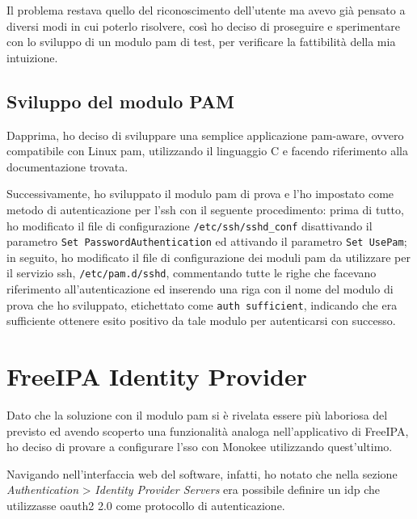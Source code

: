 Il problema restava quello del riconoscimento dell'utente ma avevo già pensato a diversi modi in cui poterlo risolvere, così ho deciso di proseguire e sperimentare con lo sviluppo di un modulo \acrshort{pam} di test, per verificare la fattibilità della mia intuizione.

\subsection{Sviluppo del modulo PAM}
Dapprima, ho deciso di sviluppare una semplice applicazione \acrshort{pam}-aware\cite{site:pam-app}, ovvero compatibile con Linux \acrshort{pam}, utilizzando il linguaggio C e facendo riferimento alla documentazione trovata\cite{site:writing-pam-application}\cite{site:understanding-pam}\cite{site:pam-configuration}\cite{site:linux-man-online}.  

Successivamente, ho sviluppato il modulo \acrshort{pam} di prova\cite{site:pam-module}\cite{site:pam-module-oidc} e l'ho impostato come metodo di autenticazione per l'\acrshort{ssh} con il seguente procedimento\cite{site:writing-pam-module}: prima di tutto, ho modificato il file di configurazione \texttt{/etc/ssh/sshd\_conf} disattivando il parametro \texttt{Set PasswordAuthentication} ed attivando il parametro \texttt{Set UsePam}; in seguito, ho modificato il file di configurazione dei moduli \acrshort{pam} da utilizzare per il servizio \acrshort{ssh}, \texttt{/etc/pam.d/sshd}, commentando tutte le righe che facevano riferimento all'autenticazione ed inserendo una riga con il nome del modulo di prova che ho sviluppato, etichettato come \texttt{auth  sufficient}, indicando che era sufficiente ottenere esito positivo da tale modulo per autenticarsi con successo. 

\section{FreeIPA Identity Provider}

Dato che la soluzione con il modulo \acrshort{pam} si è rivelata essere più laboriosa del previsto ed avendo scoperto una funzionalità analoga nell'applicativo di FreeIPA, ho deciso di provare a configurare l'\acrshort{sso} con Monokee utilizzando quest'ultimo. 

Navigando nell'interfaccia web del software, infatti, ho notato che nella sezione \textit{Authentication} > \textit{Identity Provider Servers} era possibile definire un \acrshort{idp} che utilizzasse \acrshort{oauth2} 2.0 come protocollo di autenticazione\cite{site:freeipa-docs}.

